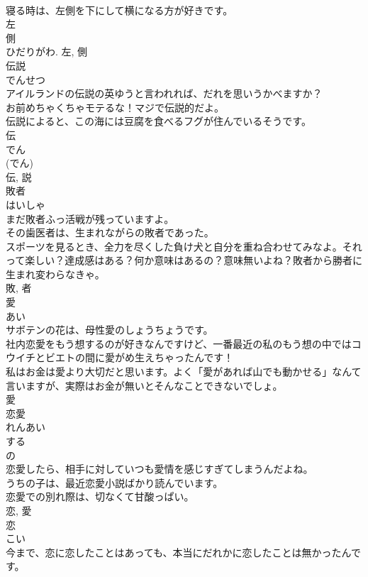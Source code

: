 \documentclass[8pt]{extreport}
\begin{document}
\begin{CJK}{UTF8}{min}
\\	寝る時は、左側を下にして横になる方が好きです。	
\\	左 
\\	側 
\\	ひだりがわ.	左, 側	
\\	伝説	
\\	でんせつ	
\\	アイルランドの伝説の英ゆうと言われれば、だれを思いうかべますか？	
\\	お前めちゃくちゃモテるな！マジで伝説的だよ。	
\\	伝説によると、この海には豆腐を食べるフグが住んでいるそうです。	
\\	伝 
\\	でん 
\\	(でん) 
\\	伝, 説	
\\	敗者	
\\	はいしゃ	
\\	まだ敗者ふっ活戦が残っていますよ。	
\\	その歯医者は、生まれながらの敗者であった。	
\\	スポーツを見るとき、全力を尽くした負け犬と自分を重ね合わせてみなよ。それって楽しい？達成感はある？何か意味はあるの？意味無いよね？敗者から勝者に生まれ変わらなきゃ。	
\\	敗, 者	
\\	愛	
\\	あい	
\\	サボテンの花は、母性愛のしょうちょうです。	
\\	社内恋愛をもう想するのが好きなんですけど、一番最近の私のもう想の中ではコウイチとビエトの間に愛がめ生えちゃったんです！	
\\	私はお金は愛より大切だと思います。よく「愛があれば山でも動かせる」なんて言いますが、実際はお金が無いとそんなことできないでしょ。	
\\	愛	
\\	恋愛	
\\	れんあい	
\\	する 
\\	の 
\\	恋愛したら、相手に対していつも愛情を感じすぎてしまうんだよね。	
\\	うちの子は、最近恋愛小説ばかり読んでいます。	
\\	恋愛での別れ際は、切なくて甘酸っぱい。	
\\	恋, 愛	
\\	恋	
\\	こい	
\\	今まで、恋に恋したことはあっても、本当にだれかに恋したことは無かったんです。	

\end{CJK}
\end{document}
